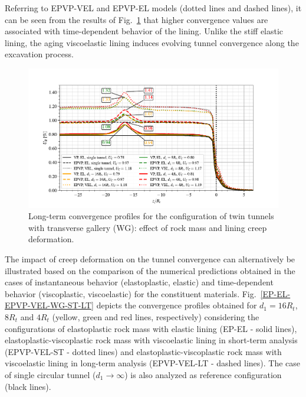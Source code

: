\documentclass[a4paper,fleqn]{cas-sc}
\begin{document}
Referring to EPVP-VEL and EPVP-EL models (dotted lines and dashed lines), it can be seen from the results of Fig.~\ref{VP-EL-EPVP-VEL-WG-LT} that higher convergence values are associated with time-dependent behavior of the lining. Unlike the stiff elastic lining, the aging viscoelastic lining induces evolving tunnel convergence along the excavation process.

\begin{figure}[h!]
	\centering
	\includegraphics[scale=0.9]{Convergence Profiles - VP_EPVP_EL_VEL_WG_LT_anotate.pdf}
	\caption{Long-term convergence profiles for the configuration of twin tunnels with transverse gallery (WG): effect of rock mass and lining creep deformation.}
	\label{VP-EL-EPVP-VEL-WG-LT}
\end{figure}
\FloatBarrier

The impact of creep deformation on the tunnel convergence can alternatively be illustrated based on the comparison of the numerical predictions obtained in the cases of instantaneous behavior (elastoplastic, elastic) and time-dependent behavior (viscoplastic, viscoelastic) for the constituent materials. Fig.~\ref{EP-EL-EPVP-VEL-WG-ST-LT} depicts the convergence profiles obtained for $d_1=16R_t$, $8R_t$ and $4R_t$ (yellow, green and red lines, respectively) considering the configurations of elastoplastic rock mass with elastic lining (EP-EL - solid lines), elastoplastic-viscoplastic rock mass with viscoelastic lining in short-term analysis (EPVP-VEL-ST - dotted lines) and elastoplastic-viscoplastic rock mass with viscoelastic lining in long-term analysis (EPVP-VEL-LT - dashed lines). The case of single circular tunnel ($d_1  \rightarrow \infty$) is also analyzed as reference configuration (black lines).
\end{document}
